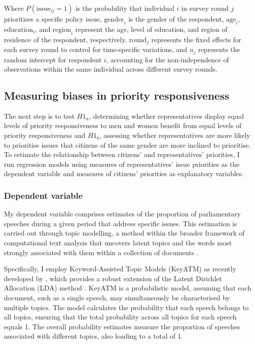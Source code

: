 Where $P(\text{issue}_{ij} = 1)$ is the probability that individual $i$ in survey round $j$ prioritises a specific policy issue, $\text{gender}_i$ is the gender of the respondent, $\text{age}_i$, $\text{education}_i$, and $\text{region}_i$ represent the age, level of education, and region of residence of the respondent, respectively. $\text{round}_j$ represents the fixed effects for each survey round to control for time-specific variations, and $u_j$ represents the random intercept for respondent $i$, accounting for the non-independence of observations within the same individual across different survey rounds.

\subsection*{Measuring biases in priority responsiveness}
The next step is to test $H1_{a}$, determining whether representatives display equal levels of priority responsiveness to men and women benefit from equal levels of priority responsiveness and $H1_{b}$, assessing whether representatives are more likely to prioritise issues that citizens of the same gender are more inclined to prioritise. To estimate the relationship between citizens' and representatives' priorities, I run regression models using measures of representatives' issue priorities as the dependent variable and measures of citizens' priorities as explanatory variables. 

\subsubsection*{Dependent variable}
My dependent variable comprises estimates of the proportion of parliamentary speeches during a given period that address specific issues. This estimation is carried out through topic modelling, a method within the broader framework of computational text analysis that uncovers latent topics and the words most strongly associated with them within a collection of documents \parencite[147]{grimmer_text_2022}.

Specifically, I employ Keyword-Assisted Topic Models (KeyATM) as recently developed by \textcite{eshima_keyword_2023}, which provides a robust extension of the Latent Dirichlet Allocation (LDA) method \parencite{blei_latent_2003}. KeyATM is a probabilistic model, assuming that each document, such as a single speech, may simultaneously be characterised by multiple topics. The model calculates the probability that each speech belongs to all topics, ensuring that the total probability across all topics for each speech equals 1. The overall probability estimates measure the proportion of speeches associated with different topics, also loading to a total of 1. 

